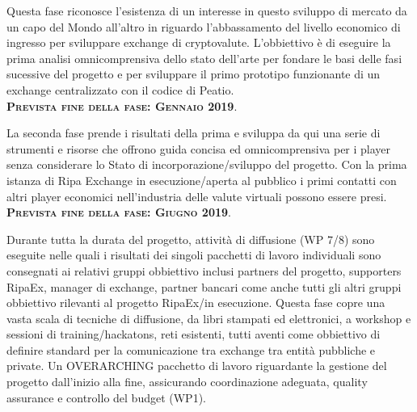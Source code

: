 \documentclass[11pt,fleqn,oneside]{book} %
\begin{document}
\begin{center}
\begin{tcolorbox}[roadmapBox,
	title=\textbf{\textsc{Finanziamneto del progetto: XPX presale e RIPA TEC (WP2)}}]

	Questa fase riconosce l'esistenza di un interesse in questo sviluppo di mercato
	da un capo del Mondo all'altro in riguardo l'abbassamento del livello economico di ingresso
	per sviluppare exchange di cryptovalute.
	L'obbiettivo è di eseguire la prima analisi omnicomprensiva dello stato dell'arte per fondare
	le basi delle fasi sucessive del progetto e per sviluppare il primo prototipo
	funzionante di un exchange centralizzato con il codice di Peatio.\\
	\vspace{1cm}
	\centering\textbf{\textsc{Prevista fine della fase: Gennaio 2019}}.
\end{tcolorbox}

\resizebox{0.05\textwidth}{26pt}{$\Downarrow$}

\begin{tcolorbox}[roadmapBox,
	title=\textbf{\textsc{Apertura del primo exchange e sviluppo di strumenti e risorse (WP3)}}]

	La seconda fase prende i risultati della prima e sviluppa da qui
	una serie di strumenti e risorse che offrono guida concisa ed omnicomprensiva per 
	i player senza considerare lo Stato di incorporazione/sviluppo del progetto. Con la prima
	istanza di Ripa Exchange in esecuzione/aperta al pubblico i primi contatti con altri player economici
	nell'industria delle valute virtuali possono essere presi.\\
	\vspace{1cm}
	\centering\textbf{\textsc{Prevista fine della fase: Giugno 2019}}.
\end{tcolorbox}

\resizebox{0.05\textwidth}{26pt}{$\Downarrow$}

\begin{tcolorbox}[roadmapBox,
	title=\textbf{\textsc{Esecuzione, diffusione (WP 7/8) e Coordinamento del Progetto (WP1)}}]

	Durante tutta la durata del progetto,
	attività di diffusione (WP 7/8) sono eseguite nelle quali i risultati dei singoli
	pacchetti di lavoro individuali sono consegnati ai relativi gruppi obbiettivo inclusi
	partners del progetto, supporters RipaEx, manager di exchange, partner bancari come anche
	tutti gli altri gruppi obbiettivo rilevanti al progetto RipaEx/in esecuzione.
	Questa fase copre una vasta scala di tecniche di diffusione, da libri stampati ed 
	elettronici, a workshop e sessioni di training/hackatons, reti esistenti, tutti aventi 
	come obbiettivo di definire standard per la comunicazione tra exchange tra entità pubbliche e private.
	Un OVERARCHING pacchetto di lavoro riguardante la gestione del progetto dall'inizio alla fine, 
	assicurando coordinazione adeguata, quality assurance e controllo del budget (WP1).
\end{tcolorbox}


\end{center}
\end{document}
